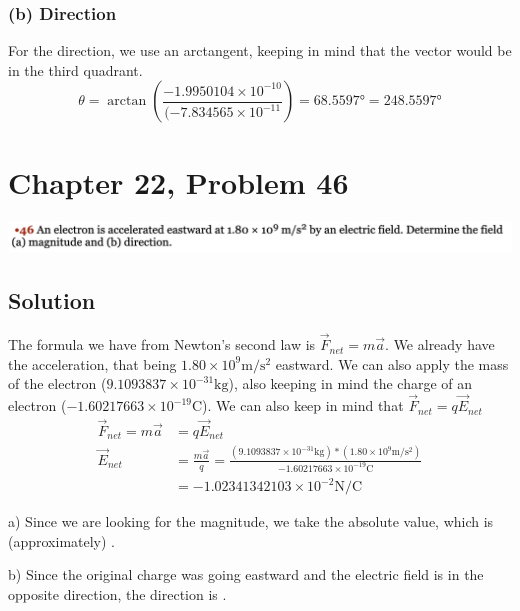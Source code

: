 \documentclass[12pt]{article}
\begin{document}
\subsubsection*{(b) Direction}
For the direction, we use an arctangent, keeping in mind that the vector would be in the third quadrant. 
\begin{equation*}
    \theta = \arctan\left(\frac{-1.9950104 \times 10^{-10}}{(-7.834565 \times 10^{-11}}\right)
        =   68.5597 \unit{\degree}  =   \boxed{248.5597 \unit{\degree}}
\end{equation*}


\pagebreak
\section*{Chapter 22, Problem 46}
\includegraphics[width=\textwidth]{picture_7.png}

\subsection*{Solution}
The formula we have from Newton's second law is $\vec{F}_{net} = m\vec{a}$. We already have the acceleration, that being $1.80 \times 10^9 \unit{\meter/\second^2}$ eastward. We can also apply the mass of the electron ($9.1093837 \times 10^{-31} \unit{\kilo\gram}$), also keeping in mind the charge of an electron ($-1.60217663 \times 10^{-19} \unit{\coulomb}$). We can also keep in mind that $\vec{F}_{net} = q \vec{E}_{net}$
\begin{align*}
    \vec{F}_{net}   =   m\vec{a}
        &=  q \vec{E}_{net}\\
    \vec{E}_{net}   &=  \frac{m\vec{a}}{q}
        =   \frac{(9.1093837 \times 10^{-31} \unit{\kilo\gram})*(1.80 \times 10^9 \unit{\meter/\second^2})}{-1.60217663 \times 10^{-19} \unit{\coulomb}}\\
        &=  -1.02341342103 \times 10^{-2} \unit{\newton/\coulomb}
\end{align*}

a) Since we are looking for the magnitude, we take the absolute value, which is (approximately) .

b) Since the original charge was going eastward and the electric field is in the opposite direction, the direction is .
\end{document}
